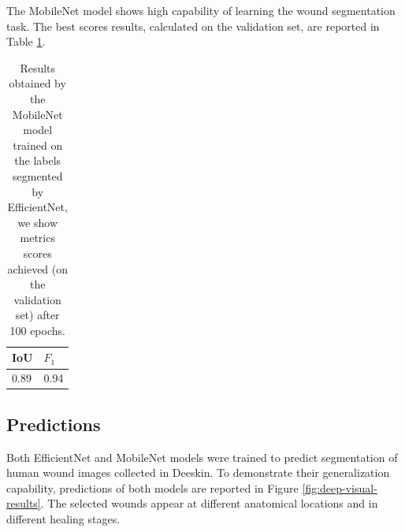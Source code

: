 \documentclass[../main.tex]{subfiles}
\begin{document}
The MobileNet model shows high capability of learning the wound segmentation task. 
The best scores results, calculated on the validation set, are reported in Table \ref{tab:results-mob-deepskin}.
\begin{table}[H]
    \centering
    
    \begin{tabular}{|l|l|}
    \hline
         IoU  & $F_1$  \\ \hline
         0.89 & 0.94 \\ \hline
    \end{tabular}
    \caption{Results obtained by the MobileNet model trained on the labels segmented by EfficientNet, we show metrics scores achieved (on the validation set) after 100 epochs.}\label{tab:results-mob-deepskin}
\end{table}

\subsection{Predictions}
Both EfficientNet and MobileNet models were trained to predict segmentation of human wound images collected in Deeskin. 
To demonstrate their generalization capability, predictions of both models are reported in Figure \ref{fig:deep-visual-results}.
The selected wounds appear at different anatomical locations and in different healing stages.
\end{document}
